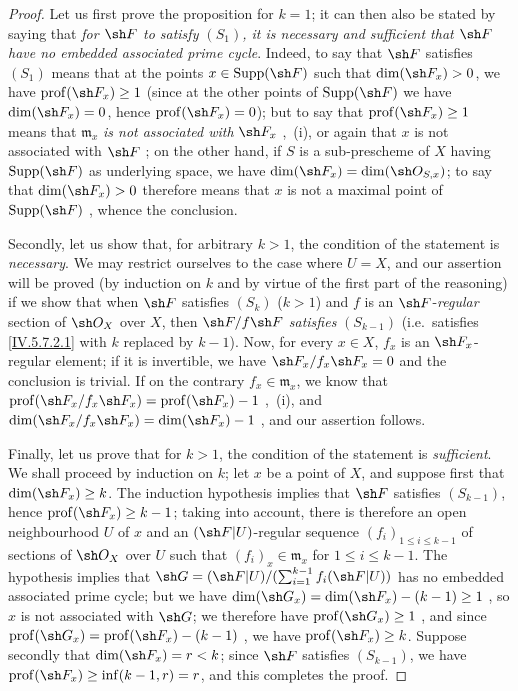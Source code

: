 \begin{proof}
Let us first prove the proposition for $k=1$; it can then also be stated
by saying that \emph{for $\sh F$ to satisfy $(S_1)$, it is necessary and
sufficient that $\sh F$ have no embedded associated prime cycle}.  Indeed,
to say that $\sh F$ satisfies $(S_1)$ means that at the points
$x\in\operatorname{Supp}(\sh F)$ such that $\dim(\sh F_x)>0$, we have
$\operatorname{prof}(\sh F_x)\geq1$ (since at the other points of
$\operatorname{Supp}(\sh F)$ we have $\dim(\sh F_x)=0$, hence
$\operatorname{prof}(\sh F_x)=0$); but to say that
$\operatorname{prof}(\sh F_x)\geq1$ means that $\mathfrak m_x$
\emph{is not associated with} $\sh F_x$ ,~(i), or
again that $x$ is not associated with $\sh F$ ; on the
other hand, if $S$ is a sub-prescheme of $X$ having
$\operatorname{Supp}(\sh F)$ as underlying space, we have
 $\dim(\sh F_x)=\dim(\sh O_{S,x})$; to say that
$\dim(\sh F_x)>0$ therefore means that $x$ is not a maximal point of
$\operatorname{Supp}(\sh F)$ , whence the conclusion.

Secondly, let us show that, for arbitrary $k>1$, the condition of the
statement is \emph{necessary}.  We may restrict ourselves to the case
where $U=X$, and our assertion will be proved (by induction on $k$ and by
virtue of the first part of the reasoning) if we show that when $\sh F$
satisfies $(S_k)$ ($k>1$) and $f$ is an $\sh F$-\emph{regular} section
of $\sh O_X$ over $X$, then $\sh F/f\sh F$ \emph{satisfies}
$(S_{k-1})$ (i.e.\ satisfies \eqref{IV.5.7.2.1} with $k$ replaced by
$k-1$).  Now, for every $x\in X$, $f_x$ is an $\sh F_x$-regular element;
if it is invertible, we have $\sh F_x/f_x\sh F_x=0$ and the conclusion is
trivial.  If on the contrary $f_x\in\mathfrak m_x$, we know that
$\operatorname{prof}(\sh F_x/f_x\sh F_x)
=\operatorname{prof}(\sh F_x)-1$ ,~(i), and
$\dim(\sh F_x/f_x\sh F_x)=\dim(\sh F_x)-1$ , and our
assertion follows.

Finally, let us prove that for $k>1$, the condition of the statement is
\emph{sufficient}.  We shall proceed by induction on $k$; let $x$ be a
point of $X$, and suppose first that $\dim(\sh F_x)\geq k$.  The
induction hypothesis implies that $\sh F$ satisfies $(S_{k-1})$, hence
$\operatorname{prof}(\sh F_x)\geq k-1$; taking  into
account, there is therefore an open neighbourhood $U$ of $x$ and an
$(\sh F|U)$-regular sequence $(f_i)_{1\leq i\leq k-1}$ of sections of
$\sh O_X$ over $U$ such that $(f_i)_x\in\mathfrak m_x$ for
$1\leq i\leq k-1$.  The hypothesis implies that
$\sh G=(\sh F|U)/(\sum_{i=1}^{k-1}f_i(\sh F|U))$
has no embedded associated prime cycle; but we have
$\dim(\sh G_x)=\dim(\sh F_x)-(k-1)\geq1$ , so $x$
is not associated with $\sh G$; we therefore have
$\operatorname{prof}(\sh G_x)\geq1$ , and since
$\operatorname{prof}(\sh G_x)=\operatorname{prof}(\sh F_x)-(k-1)$
, we have $\operatorname{prof}(\sh F_x)\geq k$.
Suppose secondly that $\dim(\sh F_x)=r<k$; since $\sh F$ satisfies
$(S_{k-1})$, we have
$\operatorname{prof}(\sh F_x)\geq\inf(k-1,r)=r$, and this completes the
proof.
\end{proof}

